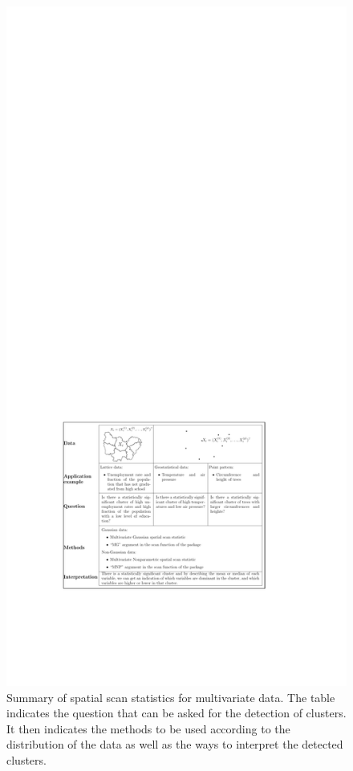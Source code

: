 \begin{figure}[h!]
\centering
\includegraphics[width=\linewidth]{code_RJ_multi.pdf}
\caption{Summary of spatial scan statistics for multivariate data. The table indicates the question that can be asked for the detection of clusters. It then indicates the methods to be used according to the distribution of the data as well as the ways to interpret the detected clusters.
}
\end{figure}
